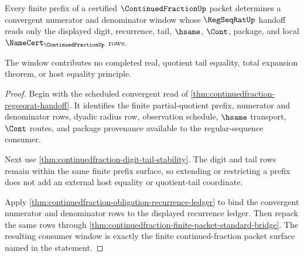 \begin{theorem}
\label{thm:continuedfraction-prefix-convergent-window}
Every finite prefix of a certified $\ContinuedFractionUp$ packet determines a
convergent numerator and denominator window whose $\RegSeqRatUp$ handoff reads
only the displayed digit, recurrence, tail, $\hsame$, $\Cont$, package, and
local $\NameCert_{\ContinuedFractionUp}$ rows.

The window contributes no completed real, quotient tail equality, total
expansion theorem, or host equality principle.
\end{theorem}
\begin{proof}
Begin with the scheduled convergent read of
\autoref{thm:continuedfraction-regseqrat-handoff}. It identifies the finite
partial-quotient prefix, numerator and denominator rows, dyadic radius row,
observation schedule, $\hsame$ transport, $\Cont$ routes, and package
provenance available to the regular-sequence consumer.

Next use \autoref{thm:continuedfraction-digit-tail-stability}. The digit and
tail rows remain within the same finite prefix surface, so extending or
restricting a prefix does not add an external host equality or quotient-tail
coordinate.

Apply \autoref{thm:continuedfraction-obligation-recurrence-ledger} to bind the
convergent numerator and denominator rows to the displayed recurrence ledger.
Then repack the same rows through
\autoref{thm:continuedfraction-finite-packet-standard-bridge}. The resulting
consumer window is exactly the finite continued-fraction packet surface named
in the statement.
\end{proof}

